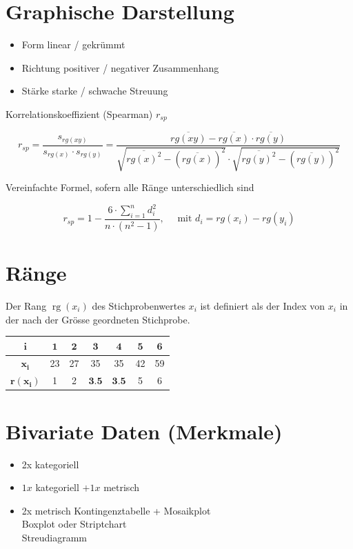 \documentclass[10pt]{article}
\begin{document}
\section*{Graphische Darstellung}
\begin{itemize}
  \item Form linear / gekrümmt
  \item Richtung positiver / negativer Zusammenhang
  \item Stärke starke / schwache Streuung
\end{itemize}

Korrelationskoeffizient (Spearman) $r_{s p}$

$$
r_{s p}=\frac{s_{r g(x y)}}{s_{r g(x)} \cdot s_{r g(y)}}=\frac{\overline{r g(x y)}-\overline{r g(x)} \cdot \overline{r g(y)}}{\sqrt{\overline{r g(x)^{2}}-(\overline{r g(x)})^{2}} \cdot \sqrt{\overline{r g(y)^{2}}-(\overline{r g(y)})^{2}}}
$$

Vereinfachte Formel, sofern alle Ränge unterschiedlich sind

$$
r_{s p}=1-\frac{6 \cdot \sum_{i=1}^{n} d_{i}^{2}}{n \cdot\left(n^{2}-1\right)}, \quad \text { mit } d_{i}=r g\left(x_{i}\right)-r g\left(y_{i}\right)
$$

\section*{Ränge}
Der Rang $\operatorname{rg}\left(x_{i}\right)$ des Stichprobenwertes $x_{i}$ ist definiert als der Index von $x_{i}$ in der nach der Grösse geordneten Stichprobe.

\begin{center}
\begin{tabular}{|c|c|c|c|c|c|c|}
\hline
$\boldsymbol{i}$ & $\mathbf{1}$ & $\mathbf{2}$ & $\mathbf{3}$ & $\mathbf{4}$ & $\mathbf{5}$ & $\mathbf{6}$ \\
\hline
$\boldsymbol{x}_{\boldsymbol{i}}$ & 23 & 27 & 35 & 35 & 42 & 59 \\
\hline
$\boldsymbol{r}\left(\boldsymbol{x}_{\boldsymbol{i}}\right)$ & 1 & 2 & $\mathbf{3 . 5}$ & $\mathbf{3 . 5}$ & 5 & 6 \\
\hline
\end{tabular}
\end{center}

\section*{Bivariate Daten (Merkmale)}
\begin{itemize}
  \item 2x kategoriell
  \item $1 x$ kategoriell $+1 x$ metrisch
  \item 2x metrisch Kontingenztabelle + Mosaikplot\\
Boxplot oder Striptchart\\
Streudiagramm
\end{itemize}
\end{document}
